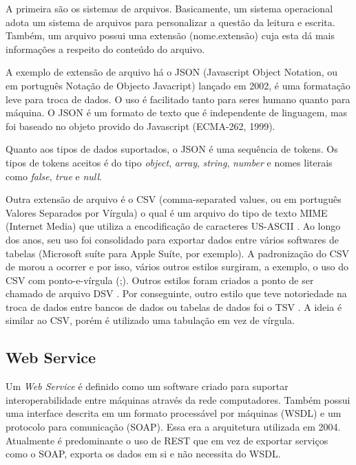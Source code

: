 \documentclass[
	12pt,				%
	openright,			%
	twoside,			%
	a4paper,			%
	english,			%
	brazil				%
	]{abntex2}
\begin{document}
		A primeira são os sistemas de arquivos.
		Basicamente, um sistema operacional adota um sistema de arquivos para personalizar a questão da leitura e escrita. \cite{tanenbaum1995sistemas}
		Também, um arquivo possui uma extensão (nome.extensão) cuja esta dá mais informações a respeito do conteúdo do arquivo.
		\par

		A exemplo de extensão de arquivo há o JSON \cite{json-rfc-8259} \cite{json-jsonOrg} (Javascript Object Notation, ou em português Notação de Objecto Javacript) lançado em 2002, é uma formatação leve para troca de dados. 
		O uso é facilitado tanto para seres humano quanto para máquina.
		O JSON é um formato de texto que é independente de linguagem, mas foi baseado no objeto provido do Javascript (ECMA-262, 1999).
		\par
		Quanto aos tipos de dados suportados, o JSON \cite{json-rfc-8259} é uma sequência de tokens. 
		Os tipos de tokens aceitos é do tipo \textit{object}, \textit{array}, \textit{string}, \textit{number} e nomes literais como \textit{false}, \textit{true} e \textit{null}.
		\par
		Outra extensão de arquivo é o CSV \cite{csv-rfc-4180} (comma-separated values, ou em português Valores Separados por Vírgula) o qual é um arquivo do tipo de texto MIME (Internet Media) \cite{mime-rfc-2048} que utiliza a encodificação de caracteres US-ASCII \cite{csv-rfc-7111}.
		Ao longo dos anos, seu uso foi consolidado para exportar dados entre vários softwares de tabelas (Microsoft suíte para Apple Suíte, por exemplo).
		A padronização do CSV de morou a ocorrer e por isso, vários outros estilos surgiram, a exemplo, o uso do CSV com ponto-e-vírgula (;).
		Outros estilos foram criados a ponto de ser chamado de arquivo DSV \cite{dsv}.
		Por conseguinte, outro estilo que teve notoriedade na troca de dados entre bancos de dados ou tabelas de dados foi o TSV \cite{tsv-iana}.
		A ideia é similar ao CSV, porém é utilizado uma tabulação em vez de vírgula.
		
		\subsection{Web Service}
			Um \emph{Web Service} \cite{webService-W3C} é definido como um software criado para suportar interoperabilidade entre máquinas através da rede computadores. Também possui uma interface descrita em um formato processável por máquinas (WSDL) e um protocolo para comunicação (SOAP). \cite{webService-W3C}
			Essa era a arquitetura utilizada em 2004. Atualmente é predominante o uso de REST que em vez de exportar serviços como o SOAP, exporta os dados em si e não necessita do WSDL. \cite{soapVSrest}
\end{document}
